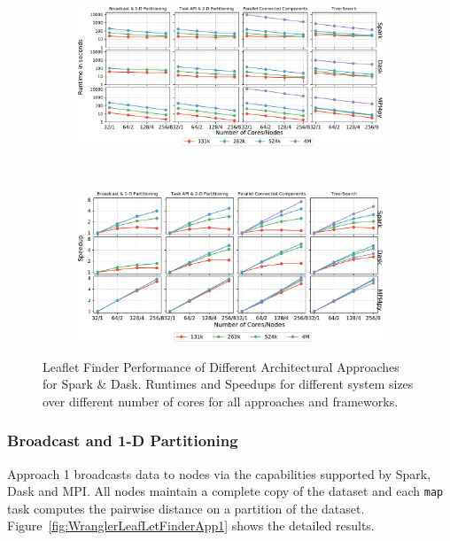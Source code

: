 \begin{figure}[t]
    \centering
    \begin{subfigure}{.85\textwidth}
        \centering
        \includegraphics[width=.95\linewidth]{figures/data_analytics_hpc/task_par/All4approachesWith4M_logscaleline.pdf}
    \end{subfigure}\\
    \begin{subfigure}{.85\textwidth}
        \centering
        \includegraphics[width=.95\linewidth]{figures/data_analytics_hpc/task_par/All4approachesWith4MSpeedup.pdf}
    \end{subfigure}
    \caption{Leaflet Finder Performance of Different Architectural Approaches
            for Spark \& Dask. Runtimes and Speedups for different system sizes
            over different number of cores for all approaches and frameworks.}
    \label{fig:All4approachesNoRp}
\end{figure}

\subsubsection*{Broadcast and 1-D Partitioning}

Approach 1 broadcasts data to nodes via the capabilities supported by Spark,
Dask and MPI. All nodes maintain a complete copy of the dataset and each
\texttt{map} task computes the pairwise distance on a partition of the dataset. 
Figure~\ref{fig:WranglerLeafLetFinderApp1} shows the detailed results.

